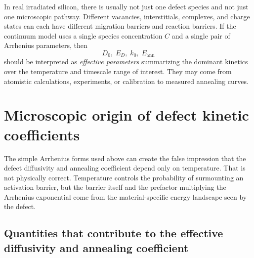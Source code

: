 \documentclass[11pt]{article}
\begin{document}
In real irradiated silicon, there is usually not just one defect species and not just one microscopic pathway. Different vacancies, interstitials, complexes, and charge states can each have different migration barriers and reaction barriers. If the continuum model uses a single species concentration $C$ and a single pair of Arrhenius parameters, then
\begin{equation}
D_0,\; E_D,\; k_0,\; E_{\mathrm{ann}}
\end{equation}
should be interpreted as \emph{effective parameters} summarizing the dominant kinetics over the temperature and timescale range of interest. They may come from atomistic calculations, experiments, or calibration to measured annealing curves.

\section{Microscopic origin of defect kinetic coefficients}

The simple Arrhenius forms used above can create the false impression that the defect diffusivity and annealing coefficient depend only on temperature. That is not physically correct. Temperature controls the probability of surmounting an activation barrier, but the barrier itself and the prefactor multiplying the Arrhenius exponential come from the material-specific energy landscape seen by the defect.

\subsection{Quantities that contribute to the effective diffusivity and annealing coefficient}
\end{document}
